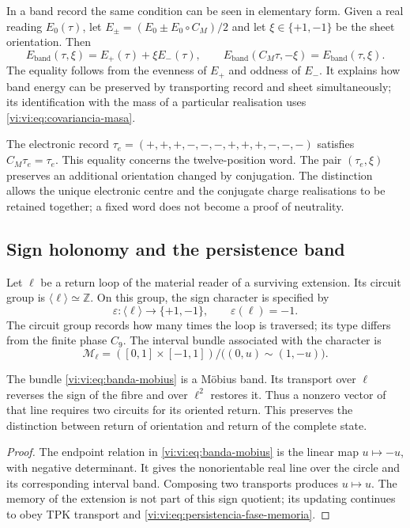 In a band record the same condition can be seen in elementary
form. Given a real reading $E_0(\tau)$, let
$E_\pm=(E_0\pm E_0\circ C_M)/2$ and let $\xi\in\{+1,-1\}$
be the sheet orientation. Then
\begin{equation}
 E_{\mathrm{band}}(\tau,\xi)=E_+(\tau)+\xi E_-(\tau),\qquad
 E_{\mathrm{band}}(C_M\tau,-\xi)=E_{\mathrm{band}}(\tau,\xi).
 \label{vi:vi:eq:banda-paridad}
\end{equation}
The equality follows from the evenness of $E_+$ and oddness of $E_-$.
It explains how band energy can be preserved by transporting
record and sheet simultaneously; its identification with the mass of a
particular realisation uses \eqref{vi:vi:eq:covariancia-masa}.

The electronic record
$\tau_e=(+,+,+,-,-,-,+,+,+,-,-,-)$ satisfies $C_M\tau_e=\tau_e$.
This equality concerns the twelve-position word. The pair
$(\tau_e,\xi)$ preserves an additional orientation changed by
conjugation. The distinction allows the unique electronic
centre and the conjugate charge realisations to be retained together;
a fixed word does not become a proof of neutrality.

\subsection{Sign holonomy and the persistence band}
\label{vi:vi:subsec:mobius}

Let $\ell$ be a return loop of the material reader of a surviving
extension. Its circuit group is $\langle\ell\rangle\simeq
\mathbb Z$. On this group, the sign character is specified by
\begin{equation}
 \varepsilon:\langle\ell\rangle\longrightarrow\{+1,-1\},
 \qquad \varepsilon(\ell)=-1.
 \label{vi:vi:eq:holonomia-signo}
\end{equation}
The circuit group records how many times the loop is traversed; its
type differs from the finite phase $C_9$. The interval bundle
associated with the character is
\begin{equation}
 \mathcal M_\ell=([0,1]\times[-1,1])/
                  \bigl((0,u)\sim(1,-u)\bigr).
 \label{vi:vi:eq:banda-mobius}
\end{equation}

\begin{theorem}
\label{vi:vi:thm:retorno-mobius}
The bundle \eqref{vi:vi:eq:banda-mobius} is a Möbius band.
Its transport over $\ell$ reverses the sign of the fibre and over
$\ell^2$ restores it. Thus a nonzero vector of that line
requires two circuits for its oriented return. This preserves the
distinction between return of orientation and return of the complete state.
\end{theorem}
\begin{proof}
The endpoint relation in \eqref{vi:vi:eq:banda-mobius} is the linear
map $u\mapsto-u$, with negative determinant. It gives the nonorientable
real line over the circle and its corresponding interval
band. Composing two transports produces $u\mapsto u$.
The memory of the extension is not part of this sign quotient;
its updating continues to obey TPK transport and
\eqref{vi:vi:eq:persistencia-fase-memoria}.
\end{proof}

